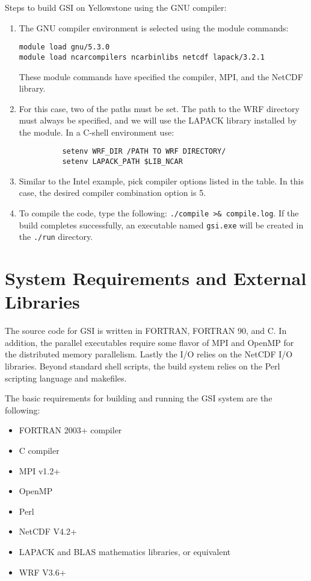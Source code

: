 Steps to build GSI on Yellowstone using the GNU compiler:
\begin{enumerate}
\item The GNU compiler environment is selected using the module commands:
\begin{verbatim}
module load gnu/5.3.0
module load ncarcompilers ncarbinlibs netcdf lapack/3.2.1 
\end{verbatim}
These module commands have specified the compiler, MPI, and the NetCDF library.
\item For this case, two of the paths must be set. The path to the WRF directory must always be specified, and we will use the LAPACK library installed by the module.  In a C-shell environment use:
\begin{verbatim}
          setenv WRF_DIR /PATH TO WRF DIRECTORY/
          setenv LAPACK_PATH $LIB_NCAR
\end{verbatim}
\item Similar to the Intel example, pick compiler options listed in the table. In this case, the desired compiler combination option is 5. 
\item To compile the code, type the following: \verb|./compile >& compile.log|. If the build completes successfully, an executable named \verb|gsi.exe| will be created in the \verb|./run| directory.
\end{enumerate}

\section{System Requirements and External Libraries}  \label{ch2_externallibs}

The source code for GSI is written in FORTRAN, FORTRAN 90, and C. In addition, the parallel executables require some flavor of MPI and OpenMP for the distributed memory parallelism. Lastly the I/O relies on the NetCDF I/O libraries. Beyond standard shell scripts, the build system relies on the Perl scripting language and makefiles.

The basic requirements for building and running the GSI system are the following:
\begin{itemize}
\item FORTRAN 2003+ compiler 
\item C compiler
\item MPI v1.2+
\item OpenMP
\item Perl
\item NetCDF V4.2+
\item LAPACK and BLAS mathematics libraries, or equivalent 
\item WRF V3.6+
\end{itemize}

